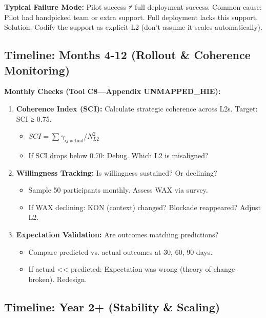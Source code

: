 \documentclass[11pt, a4paper]{article}
\begin{document}
\textbf{Typical Failure Mode:} Pilot success ≠ full deployment success. Common cause: Pilot had handpicked team or extra support. Full deployment lacks this support. Solution: Codify the support as explicit L2 (don't assume it scales automatically).

\subsection{Timeline: Months 4-12 (Rollout \& Coherence Monitoring)} \label{sec:ch15-part6c}

\textbf{Monthly Checks (Tool C8---Appendix UNMAPPED_HIE):}

\begin{enumerate}
    \item \textbf{Coherence Index (SCI):} Calculate strategic coherence across L2s. Target: SCI ≥ 0.75.
    \begin{itemize}[nosep]
        \item $SCI = \sum \gamma_{ij \text{ actual}} / N_{L2}^2$
        \item If SCI drops below 0.70: Debug. Which L2 is misaligned?
    \end{itemize}

    \item \textbf{Willingness Tracking:} Is willingness sustained? Or declining?
    \begin{itemize}[nosep]
        \item Sample 50 participants monthly. Assess WAX via survey.
        \item If WAX declining: KON (context) changed? Blockade reappeared? Adjust L2.
    \end{itemize}

    \item \textbf{Expectation Validation:} Are outcomes matching predictions?
    \begin{itemize}[nosep]
        \item Compare predicted vs. actual outcomes at 30, 60, 90 days.
        \item If actual << predicted: Expectation was wrong (theory of change broken). Redesign.
    \end{itemize}
\end{enumerate}

\subsection{Timeline: Year 2+ (Stability \& Scaling)} \label{sec:ch15-part6d}
\end{document}
